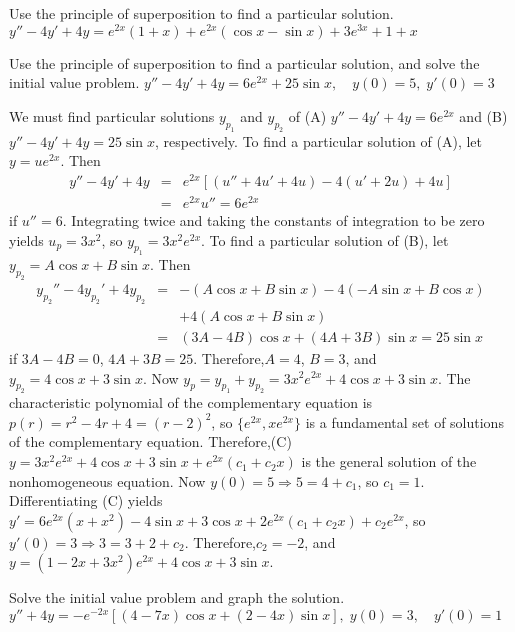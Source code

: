 \documentclass{ximera}
\begin{document}
\begin{problem}\label{exer:5.5.31} Use the
principle
of superposition to find a particular solution. $y''-4y'+4y=e^{2x}(1+x)+e^{2x}(\cos x-\sin
x)+3e^{3x}+1+x$
\end{problem}

\begin{problem}\label{exer:5.5.32}
Use the
principle
of superposition to find a particular solution, and
solve the initial value problem. $y''-4y'+4y=6e^{2x}+25\sin x , \quad   y(0)=5,\;  y'(0)=3$

\begin{solution}
    We must find particular solutions $y_{p_1}$ and $y_{p_2}$ of
(A) $y''-4y'+4y=6e^{2x}$ and
(B) $y''-4y'+4y=25\sin x$, respectively.
To find a particular solution of (A), let
 $y=ue^{2x}$. Then
\begin{eqnarray*}
y''-4y'+4y&=&e^{2x}\left[(u''+4u'+4u)-4(u'+2u)+4u\right]\\
&=&e^{2x}u''=6e^{2x}
\end{eqnarray*}
if $u''=6$. Integrating twice and taking the constants of integration
to be zero yields $u_p=3x^2$, so $y_{p_1}=3x^2e^{2x}$.
To find a particular solution of (B), let
 $y_{p_2}=A\cos x+B\sin x$. Then
\begin{eqnarray*}
y_{p_2}''-4y_{p_2}'+4y_{p_2}&=&-(A\cos x+B\sin x)-4(-A\sin x+B\cos x)\\
&&+4(A\cos x+B\sin x)\\ &=& (3A-4B)\cos x+(4A+3B)\sin x=25\sin x
\end{eqnarray*}
if $3A-4B=0$, $4A+3B=25$. Therefore,$A=4$, $B=3$, and $y_{p_2}=4\cos
x+3\sin x$. Now $y_p=y_{p_1}+y_{p_2}=3x^2e^{2x}+4\cos x+3\sin x$. The
characteristic polynomial of the complementary equation is
$p(r)=r^2-4r+4=(r-2)^2$, so $\{e^{2x},xe^{2x}\}$ is a fundamental set
of solutions of the complementary equation. Therefore,(C)
$y=3x^2e^{2x}+4\cos x+3\sin x+e^{2x}(c_1+c_2x)$ is the general
solution of the nonhomogeneous equation. Now $y(0)=5\Rightarrow
5=4+c_1$, so $c_1=1$. Differentiating (C) yields
$y'=6e^{2x}(x+x^2)-4\sin x+3\cos x+2e^{2x}(c_1+c_2x)+c_2e^{2x}$, so
$y'(0)=3\Rightarrow 3=3+2+c_2$. Therefore,$c_2=-2$, and
$y=(1-2x+3x^2)e^{2x}+4\cos x+3\sin x$.
\end{solution}
\end{problem}

\begin{problem}\label{exer:5.5.33}
Solve the initial value problem and graph the solution. $y''+4y=-e^{-2x}\left[(4-7x)\cos x+(2-4x)\sin x\right],
\;  y(0)=3, \quad   y'(0)=1$
\end{problem}
\end{document}
